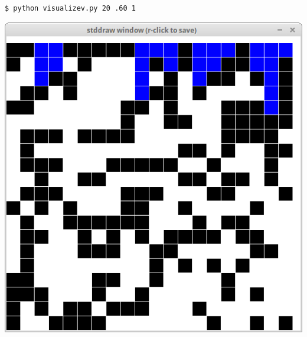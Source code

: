 \documentclass[8pt,a4paper,compress,handout]{beamer}
\begin{document}
\begin{frame}[fragile]
\begin{minipage}{160pt}
\begin{lstlisting}[language={}]
$ python visualizev.py 20 .60 1
\end{lstlisting}
\end{minipage}%
\begin{minipage}{140pt}
\hfill \includegraphics[scale=0.15]{figures/percolation8.png}
\end{minipage}

\smallskip


\end{frame}
\end{document}
